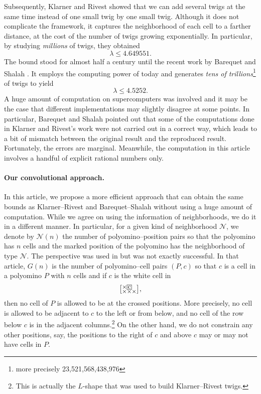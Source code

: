 \documentclass[a4paper,12pt]{article}
\makeatletter
\newcommand{\mybox}[1]{%
  \begingroup
  \setlength{\fboxsep}{1pt}%
  \fbox{\small #1}%
  \endgroup
}
\newenvironment{grid}
  {\begingroup\footnotesize
   \renewcommand{\arraystretch}{0}
   \setlength{\arraycolsep}{0pt}
   \left[\begin{array}{@{}*{10}{c}@{}}}
  {\end{array}\right]\endgroup}
\newcommand{\void}{\phantom{\times}}
\makeatother
\begin{document}
Subsequently, Klarner and Rivest showed that we can add several twigs at the same time instead of one small twig by one small twig. Although it does not complicate the framework, it captures the neighborhood of each cell to a farther distance, at the cost of the number of twigs growing exponentially. In particular, by studying \emph{millions} of twigs, they obtained
\[
    \lambda\le 4.649551.
\]
The bound stood for almost half a century until the recent work by Barequet and Shalah \cite{barequet2022improved}. It employs the computing power of today and generates \emph{tens of trillions}\footnote{more precisely 23,521,568,438,976} of twigs to yield
\[
    \lambda\le 4.5252.
\]
A huge amount of computation on supercomputers was involved and it may be the case that different implementations may slightly disagree at some points. In particular, Barequet and Shalah pointed out that some of the computations done in Klarner and Rivest's work were not carried out in a correct way, which leads to a bit of mismatch between the original result and the reproduced result. Fortunately, the errors are marginal. Meanwhile, the computation in this article involves a handful of explicit rational numbers only.



\paragraph{Our convolutional approach.}
In this article, we propose a more efficient approach that can obtain the same bounds as Klarner--Rivest and Barequet--Shalah without using a huge amount of computation.
While we agree on using the information of neighborhoods, we do it in a different manner. In particular, for a given kind of neighborhood $\mathcal N$, we denote by $\mathcal N(n)$ the number of polyomino--position pairs so that the polyomino has $n$ cells and the marked position of the polyomino has the neighborhood of type $\mathcal N$. The perspective was used in \cite{bui2025bounding} but was not exactly successful.
In that article, $G(n)$ is the number of polyomino--cell pairs $(P,c)$ so that $c$ is a cell in a polyomino $P$ with $n$ cells and if $c$ is the white cell in 
\[
    \begin{grid}
        \times & \mybox{c} & \void \\
        \times & \times & \times
    \end{grid},
\]
then no cell of $P$ is allowed to be at the crossed positions. More precisely, no cell is allowed to be adjacent to $c$ to the left or from below, and no cell of the row below $c$ is in the adjacent columns.\footnote{This is actually the $L$-shape that was used to build Klarner--Rivest twigs.} On the other hand, we do not constrain any other positions, say, the positions to the right of $c$ and above $c$ may or may not have cells in $P$.
\end{document}
